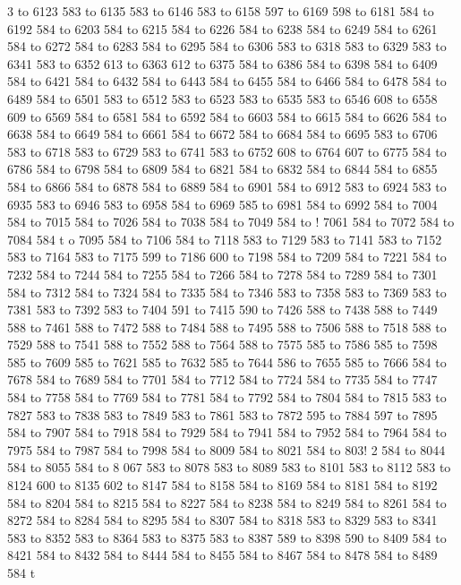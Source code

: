 3 to 6123 583 to 6135 583 to 6146 583 to 6158 597 to 6169 598 to 6181 584 to 6192 584 to 6203 584 to 6215 584 to 6226 584 to 6238 584 to 6249 584 to 6261 584 to 6272 584 to 6283 584 to 6295 584 to 6306 583 to 6318 583 to 6329 583 to 6341 583 to 6352 613 to 6363 612 to 6375 584 to 6386 584 to 6398 584 to 6409 584 to 6421 584 to 6432 584 to 6443 584 to 6455 584 to 6466 584 to 6478 584 to 6489 584 to 6501 583 to 6512 583 to 6523 583 to 6535 583 to 6546 608 to 6558 609 to 6569 584 to 6581 584 to 6592 584 to 6603 584 to 6615 584 to 6626 584 to 6638 584 to 6649 584 to 6661 584 to 6672 584 to 6684 584 to 6695 583 to 6706 583 to 6718 583 to 6729 583 to 6741 583 to 6752 608 to 6764 607 to 6775 584 to 6786 584 to 6798 584 to 6809 584 to 6821 584 to 6832 584 to 6844 584 to 6855 584 to 6866 584 to 6878 584 to 6889 584 to 6901 584 to 6912 583 to 6924 583 to 6935 583 to 6946 583 to 6958 584 to 6969 585 to 6981 584 to 6992 584 to 7004 584 to 7015 584 to 7026 584 to 7038 584 to 7049 584 to !
7061 584 to 7072 584 to 7084 584 t
o 7095 584 to 7106 584 to 7118 583 to 7129 583 to 7141 583 to 7152 583 to 7164 583 to 7175 599 to 7186 600 to 7198 584 to 7209 584 to 7221 584 to 7232 584 to 7244 584 to 7255 584 to 7266 584 to 7278 584 to 7289 584 to 7301 584 to 7312 584 to 7324 584 to 7335 584 to 7346 583 to 7358 583 to 7369 583 to 7381 583 to 7392 583 to 7404 591 to 7415 590 to 7426 588 to 7438 588 to 7449 588 to 7461 588 to 7472 588 to 7484 588 to 7495 588 to 7506 588 to 7518 588 to 7529 588 to 7541 588 to 7552 588 to 7564 588 to 7575 585 to 7586 585 to 7598 585 to 7609 585 to 7621 585 to 7632 585 to 7644 586 to 7655 585 to 7666 584 to 7678 584 to 7689 584 to 7701 584 to 7712 584 to 7724 584 to 7735 584 to 7747 584 to 7758 584 to 7769 584 to 7781 584 to 7792 584 to 7804 584 to 7815 583 to 7827 583 to 7838 583 to 7849 583 to 7861 583 to 7872 595 to 7884 597 to 7895 584 to 7907 584 to 7918 584 to 7929 584 to 7941 584 to 7952 584 to 7964 584 to 7975 584 to 7987 584 to 7998 584 to 8009 584 to 8021 584 to 803!
2 584 to 8044 584 to 8055 584 to 8
067 583 to 8078 583 to 8089 583 to 8101 583 to 8112 583 to 8124 600 to 8135 602 to 8147 584 to 8158 584 to 8169 584 to 8181 584 to 8192 584 to 8204 584 to 8215 584 to 8227 584 to 8238 584 to 8249 584 to 8261 584 to 8272 584 to 8284 584 to 8295 584 to 8307 584 to 8318 583 to 8329 583 to 8341 583 to 8352 583 to 8364 583 to 8375 583 to 8387 589 to 8398 590 to 8409 584 to 8421 584 to 8432 584 to 8444 584 to 8455 584 to 8467 584 to 8478 584 to 8489 584 t
